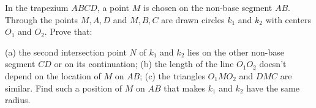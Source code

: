 In the trapezium $ABCD$, a point $M$ is chosen on the non-base segment $AB$. Through the points $M,A,D$ and $M,B,C$ are drawn circles $k_1$ and $k_2$ with centers $O_1$ and $O_2$. Prove that:

(a) the second intersection point $N$ of $k_1$ and $k_2$ lies on the other non-base segment $CD$ or on its continuation;
(b) the length of the line $O_1O_2$ doesn’t depend on the location of $M$ on $AB$;
(c) the triangles $O_1MO_2$ and $DMC$ are similar. Find such a position of $M$ on $AB$ that makes $k_1$ and $k_2$ have the same radius.